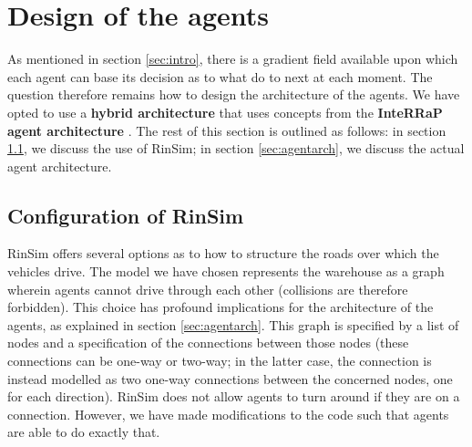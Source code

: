 \section{Design of the agents}\label{sec:agentdesign}
As mentioned in section \ref{sec:intro}, there is a gradient field available upon which each agent can base its decision as to what do to next at each moment. The question therefore remains how to design the architecture of the agents. We have opted to use a \textbf{hybrid architecture} that uses concepts from the \textbf{InteRRaP agent architecture} \cite{muller2011agent}. The rest of this section is outlined as follows: in section \ref{sec:rinsimconf}, we discuss the use of RinSim; in section \ref{sec:agentarch}, we discuss the actual agent architecture.

\subsection{Configuration of RinSim}\label{sec:rinsimconf}
RinSim \cite{rinsim} offers several options as to how to structure the roads over which the vehicles drive. The model we have chosen represents the warehouse as a graph wherein agents cannot drive through each other (collisions are therefore forbidden). This choice has profound implications for the architecture of the agents, as explained in section \ref{sec:agentarch}. This graph is specified by a list of nodes and a specification of the connections between those nodes (these connections can be one-way or two-way; in the latter case, the connection is instead modelled as two one-way connections between the concerned nodes, one for each direction). RinSim does not allow agents to turn around if they are on a connection. However, we have made modifications to the code such that agents are able to do exactly that.


